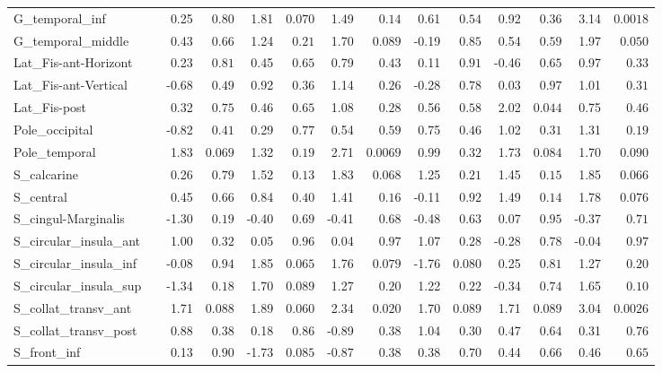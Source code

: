 {\begin{longtable}{llrrrrrrrrrrrr}
G\_temporal\_inf &  & 0.25 & $0.80$ & 1.81 & $0.070$ & 1.49 & $0.14$ & 0.61 & $0.54$ & 0.92 & $0.36$ & 3.14 & $0.0018$ \\
G\_temporal\_middle &  & 0.43 & $0.66$ & 1.24 & $0.21$ & 1.70 & $0.089$ & -0.19 & $0.85$ & 0.54 & $0.59$ & 1.97 & $0.050$ \\
Lat\_Fis-ant-Horizont &  & 0.23 & $0.81$ & 0.45 & $0.65$ & 0.79 & $0.43$ & 0.11 & $0.91$ & -0.46 & $0.65$ & 0.97 & $0.33$ \\
Lat\_Fis-ant-Vertical &  & -0.68 & $0.49$ & 0.92 & $0.36$ & 1.14 & $0.26$ & -0.28 & $0.78$ & 0.03 & $0.97$ & 1.01 & $0.31$ \\
Lat\_Fis-post &  & 0.32 & $0.75$ & 0.46 & $0.65$ & 1.08 & $0.28$ & 0.56 & $0.58$ & 2.02 & $0.044$ & 0.75 & $0.46$ \\
Pole\_occipital &  & -0.82 & $0.41$ & 0.29 & $0.77$ & 0.54 & $0.59$ & 0.75 & $0.46$ & 1.02 & $0.31$ & 1.31 & $0.19$ \\
Pole\_temporal &  & 1.83 & $0.069$ & 1.32 & $0.19$ & 2.71 & $0.0069$ & 0.99 & $0.32$ & 1.73 & $0.084$ & 1.70 & $0.090$ \\
S\_calcarine &  & 0.26 & $0.79$ & 1.52 & $0.13$ & 1.83 & $0.068$ & 1.25 & $0.21$ & 1.45 & $0.15$ & 1.85 & $0.066$ \\
S\_central &  & 0.45 & $0.66$ & 0.84 & $0.40$ & 1.41 & $0.16$ & -0.11 & $0.92$ & 1.49 & $0.14$ & 1.78 & $0.076$ \\
S\_cingul-Marginalis &  & -1.30 & $0.19$ & -0.40 & $0.69$ & -0.41 & $0.68$ & -0.48 & $0.63$ & 0.07 & $0.95$ & -0.37 & $0.71$ \\
S\_circular\_insula\_ant &  & 1.00 & $0.32$ & 0.05 & $0.96$ & 0.04 & $0.97$ & 1.07 & $0.28$ & -0.28 & $0.78$ & -0.04 & $0.97$ \\
S\_circular\_insula\_inf &  & -0.08 & $0.94$ & 1.85 & $0.065$ & 1.76 & $0.079$ & -1.76 & $0.080$ & 0.25 & $0.81$ & 1.27 & $0.20$ \\
S\_circular\_insula\_sup &  & -1.34 & $0.18$ & 1.70 & $0.089$ & 1.27 & $0.20$ & 1.22 & $0.22$ & -0.34 & $0.74$ & 1.65 & $0.10$ \\
S\_collat\_transv\_ant &  & 1.71 & $0.088$ & 1.89 & $0.060$ & 2.34 & $0.020$ & 1.70 & $0.089$ & 1.71 & $0.089$ & 3.04 & $0.0026$ \\
S\_collat\_transv\_post &  & 0.88 & $0.38$ & 0.18 & $0.86$ & -0.89 & $0.38$ & 1.04 & $0.30$ & 0.47 & $0.64$ & 0.31 & $0.76$ \\
S\_front\_inf &  & 0.13 & $0.90$ & -1.73 & $0.085$ & -0.87 & $0.38$ & 0.38 & $0.70$ & 0.44 & $0.66$ & 0.46 & $0.65$ \\

\end{longtable}}
